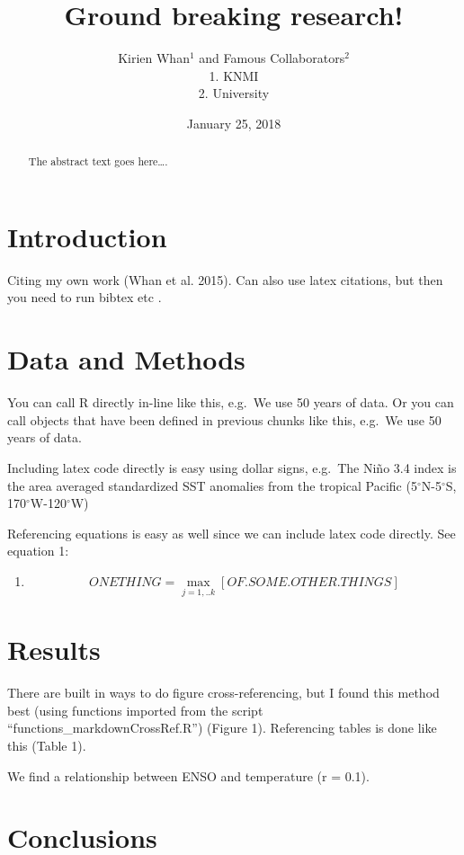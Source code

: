 \documentclass[]{article}
\title{Ground breaking research!}
\author{Kirien Whan\(^1\) and Famous Collaborators\(^2\)\\
1. KNMI\\
2. University}
\date{January 25, 2018}
\providecommand{\tightlist}{%
  \setlength{\itemsep}{0pt}\setlength{\parskip}{0pt}}
\begin{document}
\maketitle
\begin{abstract}
The abstract text goes here\ldots{}.
\end{abstract}

\section{Introduction}\label{introduction}

Citing my own work (Whan et al. 2015). Can also use latex citations, but
then you need to run bibtex etc \citep{whan2015impact}.

\section{Data and Methods}\label{data-and-methods}

You can call R directly in-line like this, e.g.~We use 50 years of data.
Or you can call objects that have been defined in previous chunks like
this, e.g.~We use 50 years of data.

Including latex code directly is easy using dollar signs, e.g.~The Niño
3.4 index is the area averaged standardized SST anomalies from the
tropical Pacific (5\(^{\circ}\)N-5\(^{\circ}\)S,
170\(^{\circ}\)W-120\(^{\circ}\)W)

Referencing equations is easy as well since we can include latex code
directly. See equation 1:

\begin{enumerate}
\def\labelenumi{(\arabic{enumi})}
\tightlist
\item
  \[  ONETHING  = \max\limits_{j=1,..k}[OF.SOME.OTHER.THINGS] \]
\end{enumerate}

\section{Results}\label{results}

There are built in ways to do figure cross-referencing, but I found this
method best (using functions imported from the script
``functions\_markdownCrossRef.R'') (Figure 1). Referencing tables is
done like this (Table 1).

We find a relationship between ENSO and temperature (r = 0.1).

\section{Conclusions}\label{conclusions}
\end{document}
